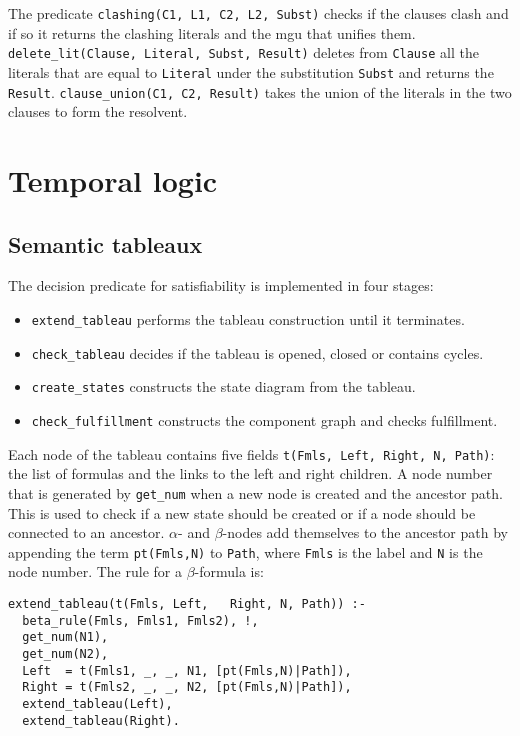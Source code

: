 \documentclass[11pt]{article}
\newcommand*{\p}[1]{\textup{\texttt{#1}}}
\begin{document}
The predicate \p{clashing(C1, L1, C2, L2, Subst)} checks if the clauses
clash and if so it returns the clashing literals and the mgu that
unifies them. \p{delete\_lit(Clause, Literal, Subst, Result)} deletes
from \p{Clause} all the literals that are equal to \p{Literal} under the
substitution \p{Subst} and returns the \p{Result}. \p{clause\_union(C1,
C2, Result)} takes the union of the literals in the two clauses to form
the resolvent.



\section{Temporal logic}

\subsection{Semantic tableaux}\label{s.tabtl}

The decision predicate for
satisfiability is implemented in four stages:
\begin{itemize}
\item \p{extend\_tableau} performs the tableau
construction until it terminates.
\item \p{check\_tableau} decides if the tableau is opened,
closed or contains cycles.
\item \p{create\_states} constructs the state diagram
from the tableau.
\item \p{check\_fulfillment}
constructs the component graph and checks fulfillment.
\end{itemize}

Each node of the tableau contains five fields \p{t(Fmls, Left, Right, N,
Path)}: the list of formulas and the links to the left and right
children. A node number that is generated by \p{get\_num} when a new
node is created and the ancestor path. This is used to check if a new
state should be created or if a node should be connected to an ancestor.
$\alpha$- and $\beta$-nodes add themselves to the ancestor path by
appending the term \p{pt(Fmls,N)} to \p{Path}, where \p{Fmls} is the
label and \p{N} is the node number. The rule for a $\beta$-formula is:

\begin{verbatim}
extend_tableau(t(Fmls, Left,   Right, N, Path)) :-
  beta_rule(Fmls, Fmls1, Fmls2), !,
  get_num(N1),
  get_num(N2),
  Left  = t(Fmls1, _, _, N1, [pt(Fmls,N)|Path]),
  Right = t(Fmls2, _, _, N2, [pt(Fmls,N)|Path]),
  extend_tableau(Left),
  extend_tableau(Right).
\end{verbatim}
\end{document}
